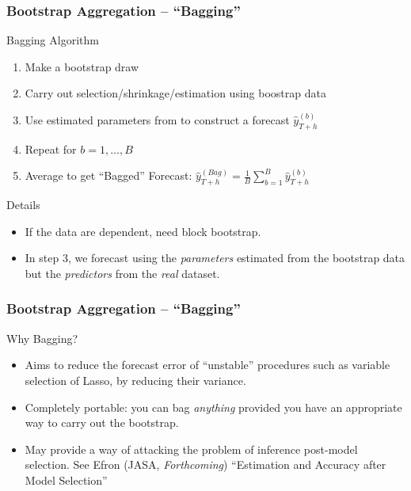 \documentclass[handout]{beamer}
\begin{document}
\begin{frame}[c]\frametitle{Bootstrap Aggregation -- ``Bagging''}
    
\begin{block}
	{Bagging Algorithm}
	\begin{enumerate}
		\item Make a bootstrap draw  
		\item Carry out selection/shrinkage/estimation using boostrap data
		\item Use estimated parameters from to construct a forecast $\widehat{y}_{T+h}^{(b)}$
		\item Repeat for $b = 1, \hdots, B$
		\item Average to get ``Bagged'' Forecast: $\widehat{y}_{T+h}^{(Bag)} = \frac{1}{B}\sum_{b=1}^B \widehat{y}_{T+h}^{(b)}$
	\end{enumerate}
\end{block}

\begin{block}
	{Details}
	\begin{itemize}
		\item If the data are dependent, need block bootstrap.
		\item In step 3, we forecast using the \emph{parameters} estimated from the bootstrap data but the \emph{predictors} from the \emph{real} dataset.
	\end{itemize}
\end{block}

\end{frame}
\begin{frame}[c]\frametitle{Bootstrap Aggregation -- ``Bagging''}

\begin{block}
 	{Why Bagging?}
 		\begin{itemize}
 			\item Aims to reduce the forecast error of ``unstable'' procedures such as variable selection of Lasso, by reducing their variance.
 			\item Completely portable: you can bag \emph{anything} provided you have an appropriate way to carry out the bootstrap.
 			\item May provide a way of attacking the problem of inference post-model selection. See Efron (JASA, \emph{Forthcoming}) ``Estimation and Accuracy after Model Selection''
 		\end{itemize}
 \end{block} 


\end{frame}
\end{document}
